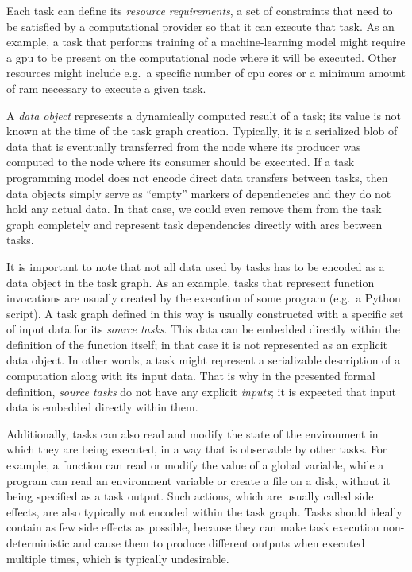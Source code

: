 Each task can define its \emph{resource requirements}, a set of constraints that need to be satisfied by
a computational provider so that it can execute that task. As an example, a task that performs
training of a machine-learning model might require a \gls{gpu} to be present on the
computational node where it will be executed. Other resources might include e.g.\ a specific number
of \gls{cpu} cores or a minimum amount of \gls{ram} necessary to execute
a given task.

A \emph{data object} represents a dynamically computed result of a task; its value is not known
at the time of the task graph creation. Typically, it is a serialized blob of data that is
eventually transferred from the node where its producer was computed to the node where its consumer
should be executed. If a task programming model does not encode direct data transfers between
tasks, then data objects simply serve as ``empty'' markers of dependencies and they do not hold any
actual data. In that case, we could even remove them from the task graph completely and represent
task dependencies directly with arcs between tasks.

It is important to note that not all data used by tasks has to be encoded as a data object in the
task graph. As an example, tasks that represent function invocations are usually created by the
execution of some program (e.g.\ a Python script). A task graph defined in this way is usually
constructed with a specific set of input data for its \emph{source tasks}. This data can be
embedded directly within the definition of the function itself; in that case it is not represented
as an explicit data object. In other words, a task might represent a serializable description of a
computation along with its input data. That is why in the presented formal definition,
\emph{source tasks} do not have any explicit \emph{inputs}; it is expected that input
data is embedded directly within them.

Additionally, tasks can also read and modify the state of the environment in which they are being
executed, in a way that is observable by other tasks. For example, a function can read or modify
the value of a global variable, while a program can read an environment variable or create a file
on a disk, without it being specified as a task output. Such actions, which are usually called side
effects, are also typically not encoded within the task graph. Tasks should ideally contain as few
side effects as possible, because they can make task execution non-deterministic and cause them to
produce different outputs when executed multiple times, which is typically undesirable.

